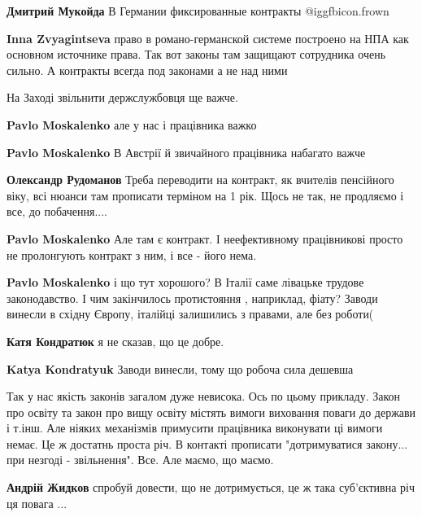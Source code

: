 \begin{itemize}
\begin{itemize} %
\textbf{Дмитрий Мукойда} В Германии фиксированные контракты  @igg{fbicon.frown} 

\textbf{Inna Zvyagintseva} право в романо-германской системе построено на НПА как основном источнике права. Так вот законы там защищают сотрудника очень сильно. А контракты всегда под законами а не над ними
\end{itemize} %

На Заході звільнити держслужбовця ще важче.

\begin{itemize} %
\textbf{Pavlo Moskalenko} але у нас і працівника важко

\textbf{Pavlo Moskalenko} В Австрії й звичайного працівника набагато важче

\textbf{Олександр Рудоманов} Треба переводити на контракт, як вчителів пенсійного віку, всі нюанси там прописати терміном на 1 рік. Щось не так, не продляємо і все, до побачення....

\textbf{Pavlo Moskalenko} Але там є контракт. І неефективному працівникові просто не пролонгують контракт з ним, і все - його нема.

\textbf{Pavlo Moskalenko} і що тут хорошого? В Італії саме лівацьке трудове законодавство. І чим закінчилось протистояння , наприклад, фіату? Заводи винесли в східну Європу, італійці залишились з правами, але без роботи(

\textbf{Катя Кондратюк} я не сказав, що це добре.

\textbf{Katya Kondratyuk} Заводи винесли, тому що робоча сила дешевша
\end{itemize} %


Так у нас якість законів загалом дуже невисока. Ось по цьому прикладу. Закон
про освіту та закон про вищу освіту містять вимоги виховання поваги до держави
і т.інш. Але ніяких механізмів примусити працівника виконувати ці вимоги немає.
Це ж достатнь проста річ. В контакті прописати "дотримуватися закону... при
незгоді - звільнення". Все. Але маємо, що маємо.

\begin{itemize} %
\textbf{Андрій Жидков} спробуй довести, що не дотримується, це ж така суб'єктивна річ ця повага ...


\end{itemize}
\end{itemize}
